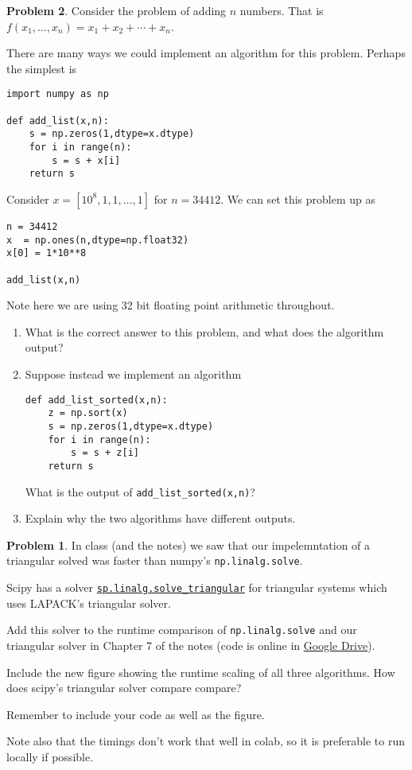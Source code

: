 \documentclass[12pt]{article}
\theoremstyle{definition}
\newtheorem{problem}{Problem}
\begin{document}
\begin{problem}
Consider the problem of adding $n$ numbers. 
That is $f(x_1, \ldots, x_n) = x_1 + x_2 + \cdots + x_n$. 

There are many ways we could implement an algorithm for this problem. Perhaps the simplest is
\begin{lstlisting}
import numpy as np

def add_list(x,n):
    s = np.zeros(1,dtype=x.dtype)
    for i in range(n):
        s = s + x[i]
    return s
\end{lstlisting}

Consider $x = [10^{8},1,1,\ldots, 1]$ for $n=34412$.
We can set this problem up as
\begin{lstlisting}
n = 34412
x  = np.ones(n,dtype=np.float32)
x[0] = 1*10**8

add_list(x,n)
\end{lstlisting}

Note here we are using 32 bit floating point arithmetic throughout. 

    \begin{enumerate}
        \item
            What is the correct answer to this problem, and what does the algorithm output?

        \item Suppose instead we implement an algorithm
\begin{lstlisting}
def add_list_sorted(x,n):
    z = np.sort(x)
    s = np.zeros(1,dtype=x.dtype)
    for i in range(n):
        s = s + z[i]
    return s
\end{lstlisting}
    What is the output of \lstinline{add_list_sorted(x,n)}?

\item Explain why the two algorithms have different outputs.
    \end{enumerate}


\clearpage
\begin{problem}

    In class (and the notes) we saw that our impelemntation of a triangular solved was faster than numpy's \lstinline{np.linalg.solve}.

    Scipy has a solver \href{https://docs.scipy.org/doc/scipy/reference/generated/scipy.linalg.solve_triangular.html}{\lstinline{sp.linalg.solve_triangular}} for triangular systems which uses LAPACK's triangular solver.

    Add this solver to the runtime comparison of \lstinline{np.linalg.solve} and our triangular solver in Chapter 7 of the notes (code is online in \href{https://drive.google.com/drive/u/0/folders/17mCJ0l6Sc4sKMXJPEklNQuDfrS6X4jcC}{Google Drive}).
    
    Include the new figure showing the runtime scaling of all three algorithms.
    How does scipy's triangular solver compare compare?

    Remember to include your code as well as the figure.

    Note also that the timings don't work that well in colab, so it is preferable to run locally if possible.

\end{problem}
\end{problem}
\end{document}
